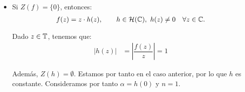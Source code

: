 \begin{ejercicio}
\begin{itemize}
        \item Si $Z(f)=\{0\}$, entonces:
        \begin{align*}
            f(z) = z\cdot h(z),\qquad h\in \mathcal{H}(\mathbb{C}),\ h(z)\neq 0 \quad \forall z\in \mathbb{C}.
        \end{align*}

        Dado $z\in \mathbb{T}$, tenemos que:
        \begin{align*}
            \left|h(z)\right| &= \left| \dfrac{f(z)}{z} \right| = 1
        \end{align*}

        Además, $Z(h)=\emptyset$. Estamos por tanto en el caso anterior, por lo que $h$ es constante. Consideramos por tanto $\alpha=h(0)$ y $n=1$.
    \end{itemize}
\end{ejercicio}

